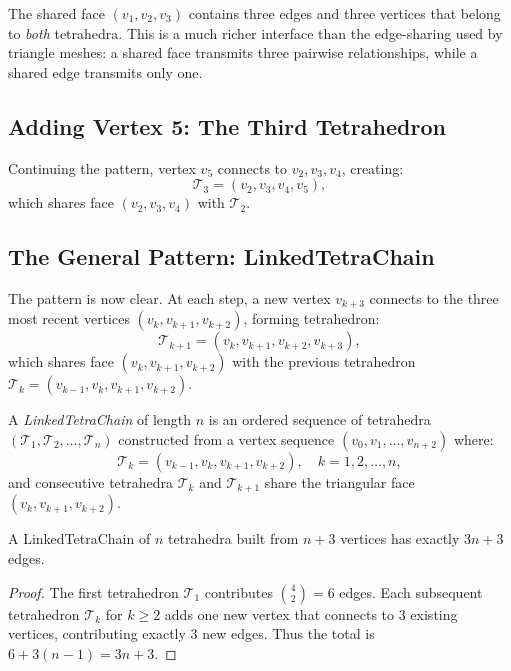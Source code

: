 \begin{remark}
The shared face $(v_1, v_2, v_3)$ contains three edges and three vertices that
belong to \emph{both} tetrahedra. This is a much richer interface than the
edge-sharing used by triangle meshes: a shared face transmits three pairwise
relationships, while a shared edge transmits only one.
\end{remark}

\subsection{Adding Vertex 5: The Third Tetrahedron}

Continuing the pattern, vertex $v_5$ connects to $v_2, v_3, v_4$, creating:
\[
  \mathcal{T}_3 = (v_2, v_3, v_4, v_5),
\]
which shares face $(v_2, v_3, v_4)$ with $\mathcal{T}_2$.

\subsection{The General Pattern: LinkedTetraChain}

The pattern is now clear. At each step, a new vertex $v_{k+3}$ connects to the
three most recent vertices $(v_k, v_{k+1}, v_{k+2})$, forming tetrahedron:
\[
  \mathcal{T}_{k+1} = (v_k, v_{k+1}, v_{k+2}, v_{k+3}),
\]
which shares face $(v_k, v_{k+1}, v_{k+2})$ with the previous tetrahedron
$\mathcal{T}_k = (v_{k-1}, v_k, v_{k+1}, v_{k+2})$.

\begin{definition}[LinkedTetraChain]
\label{def:linked-tetra-chain}
A \emph{LinkedTetraChain} of length $n$ is an ordered sequence of tetrahedra
$(\mathcal{T}_1, \mathcal{T}_2, \ldots, \mathcal{T}_n)$ constructed from a
vertex sequence $(v_0, v_1, \ldots, v_{n+2})$ where:
\begin{equation}
  \mathcal{T}_k = (v_{k-1}, v_k, v_{k+1}, v_{k+2}), \quad k = 1, 2, \ldots, n,
\end{equation}
and consecutive tetrahedra $\mathcal{T}_k$ and $\mathcal{T}_{k+1}$ share the
triangular face $(v_k, v_{k+1}, v_{k+2})$.
\end{definition}

\begin{proposition}
\label{prop:edge-count}
A LinkedTetraChain of $n$ tetrahedra built from $n + 3$ vertices has exactly
$3n + 3$ edges.
\end{proposition}
\begin{proof}
The first tetrahedron $\mathcal{T}_1$ contributes $\binom{4}{2} = 6$ edges.
Each subsequent tetrahedron $\mathcal{T}_k$ for $k \geq 2$ adds one new vertex
that connects to 3 existing vertices, contributing exactly 3 new edges.
Thus the total is $6 + 3(n-1) = 3n + 3$.
\end{proof}

